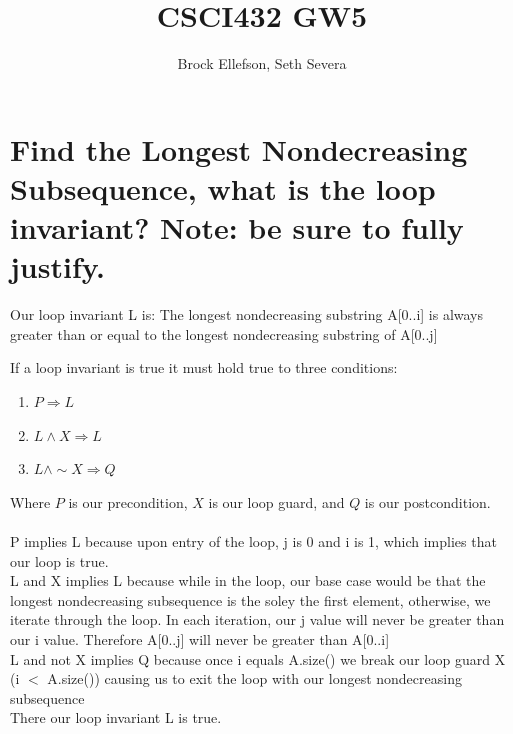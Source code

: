 \documentclass[10pt,letterpaper]{article}
\author{Brock Ellefson, Seth Severa}
\title{CSCI432 GW5}
\begin{document}
\maketitle

\section{Find the Longest Nondecreasing Subsequence, what is the loop invariant? Note: be sure to fully justify.}
Our loop invariant L is: The longest nondecreasing substring A[0..i] is always greater than or equal to the longest nondecreasing substring of A[0..j]

\noindent If a loop invariant is true it must hold true to three conditions:
\begin{enumerate}
  \item $P \Rightarrow L$
  \item $L \wedge X \Rightarrow L$
  \item $L \wedge \sim X \Rightarrow Q$
\end{enumerate}
Where $P$ is our precondition, $X$ is our loop guard, and $Q$ is our postcondition.\\
\\
P implies L because upon entry of the loop, j is 0 and i is 1, which implies that our loop is true.\\
L and X implies L because while in the loop, our base case would be that the longest nondecreasing subsequence is the soley the first element, otherwise, we iterate through the loop. In each iteration, our j value will never be greater than our i value. Therefore A[0..j] will never be greater than A[0..i]\\
L and not X implies Q because once i equals A.size() we break our loop guard X (i $<$ A.size()) causing us to exit the loop with our longest nondecreasing subsequence 
\\
There our loop invariant L is true.
\end{document}
